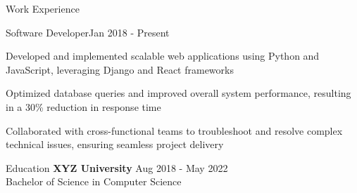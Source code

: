 \documentclass{resume} %
\begin{document}
    \begin{rSection}{Work Experience}
                    \begin{rSubsection}
                {Software Developer}{Jan 2018 - Present}
                                    {}
                                {}
                                    \item Developed and implemented scalable web applications using Python and JavaScript, leveraging Django and React frameworks
                                    \item Optimized database queries and improved overall system performance, resulting in a 30\% reduction in response time
                                    \item Collaborated with cross{-}functional teams to troubleshoot and resolve complex technical issues, ensuring seamless project delivery
                            \end{rSubsection}
            \end{rSection}

\begin{rSection}{Education}
                        \textbf{XYZ University} \hfill {Aug 2018 - May 2022} \\
                            {Bachelor of Science in Computer Science}
                         
             
         
    \end{rSection}
\end{document}
